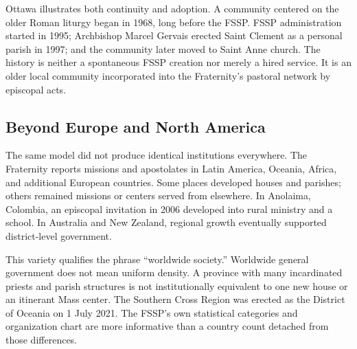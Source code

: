 Ottawa illustrates both continuity and adoption. A community centered on the older Roman liturgy began in 1968, long before the FSSP. FSSP administration started in 1995; Archbishop Marcel Gervais erected Saint Clement as a personal parish in 1997; and the community later moved to Saint Anne church. The history is neither a spontaneous FSSP creation nor merely a hired service. It is an older local community incorporated into the Fraternity's pastoral network by episcopal acts.

\subsection{Beyond Europe and North America}

The same model did not produce identical institutions everywhere. The Fraternity reports missions and apostolates in Latin America, Oceania, Africa, and additional European countries. Some places developed houses and parishes; others remained missions or centers served from elsewhere. In Anolaima, Colombia, an episcopal invitation in 2006 developed into rural ministry and a school. In Australia and New Zealand, regional growth eventually supported district-level government.

This variety qualifies the phrase ``worldwide society.'' Worldwide general government does not mean uniform density. A province with many incardinated priests and parish structures is not institutionally equivalent to one new house or an itinerant Mass center. The Southern Cross Region was erected as the District of Oceania on 1 July 2021. The FSSP's own statistical categories and organization chart are more informative than a country count detached from those differences.

